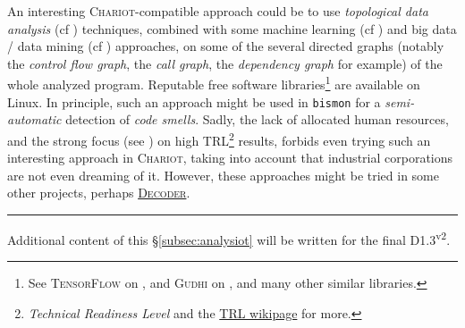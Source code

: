 An interesting \textsc{Chariot}-compatible approach could be to use
\emph{topological data analysis} 
 (cf
\cite{Chazal:2017:topodatanalys}) techniques, combined with some
machine learning (cf \cite{flach:2012:machine-learning}) and big data
 / data mining  (cf
\cite{wu:2013:big-data-mining, clarke:2016:big-data-risks,
  zuboff:2015:big-other, helbing:2019:big-data-democracy}) approaches,
on some of the several directed graphs (notably the \emph{control flow
graph}, the \emph{call graph}, the \emph{dependency graph} for
example) of the whole analyzed program. Reputable free software
libraries\footnote{See \textsc{TensorFlow} on
, and \textsc{Gudhi} on
, and many other similar
libraries.} are available on Linux. In principle, such an approach
might be used in \texttt{bismon} for a \emph{semi-automatic} detection
of   \emph{code smells}. Sadly,
the lack of allocated human resources, and the strong focus (see
\cite{Heder:2017:TRL})  on high
TRL\footnote{\emph{Technical Readiness Level} and the
\href{https://en.wikipedia.org/wiki/Technology\_readiness_level}{TRL
  wikipage} for more.} results, forbids even trying such an
interesting approach in \textsc{Chariot}, taking into account that
industrial corporations are not even dreaming of it. However, these
approaches might be tried in some other projects, perhaps
\href{https://www.decoder-project.eu/}{\textsc{Decoder}}.

\bigskip

\hrule

\medskip

Additional content of this \S\ref{subsec:analysiot} will be written for the final D1.3\textsuperscript{v2}.


